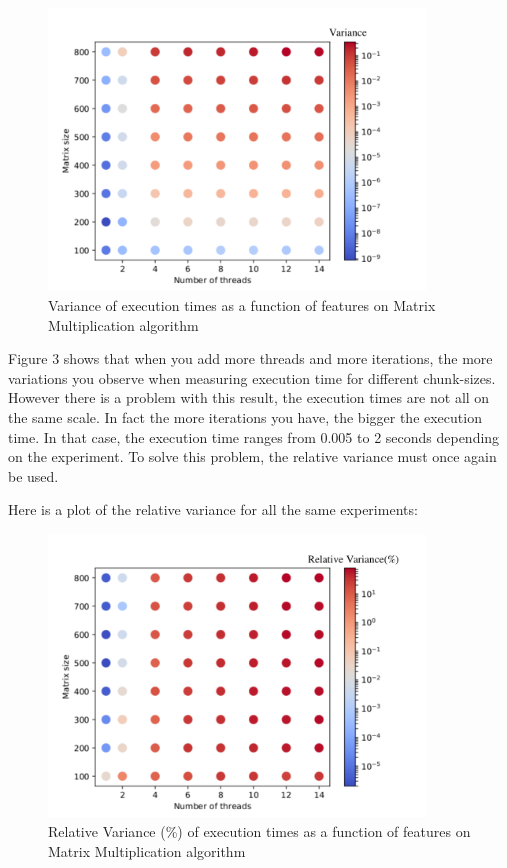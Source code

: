 \begin{figure}[H]
	\centering
	\includegraphics[width=100mm]{images/var_chunk_sizes.pdf}
	\caption{Variance of execution times as a function of features on Matrix Multiplication algorithm}
\end{figure}

 Figure 3 shows that when you add more threads and more iterations, the more variations you observe when measuring execution time for different chunk-sizes. However there is a problem with this result, the execution times are not all on the same scale. In fact the more iterations you have, the bigger the execution time. In that case, the execution time ranges from 0.005 to 2 seconds depending on the experiment. To solve this problem, the relative variance must once again be used. 

Here is a plot of the relative variance for all the same experiments:

\begin{figure}[H]
	\centering
	\includegraphics[width=100mm]{images/rel_var_chunk_sizes.pdf}
	\caption{Relative Variance (\%) of execution times as a function of features on Matrix Multiplication algorithm}
\end{figure}

